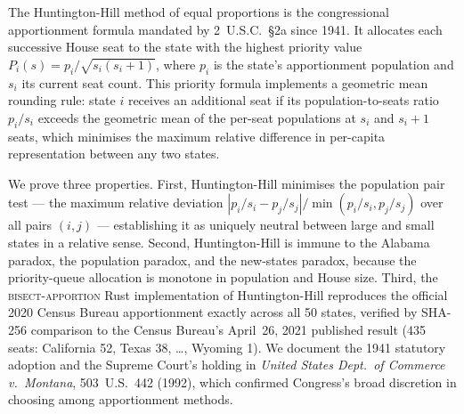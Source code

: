 The Huntington-Hill method of equal proportions is the congressional
apportionment formula mandated by 2~U.S.C.\ \S2a since 1941.
It allocates each successive House seat to the state with the highest
priority value $P_i(s) = p_i / \sqrt{s_i(s_i+1)}$, where $p_i$ is the
state's apportionment population and $s_i$ its current seat count.
This priority formula implements a geometric mean rounding rule:
state $i$ receives an additional seat if its population-to-seats ratio
$p_i/s_i$ exceeds the geometric mean of the per-seat populations at $s_i$
and $s_i+1$ seats, which minimises the maximum relative difference in
per-capita representation between any two states.

We prove three properties.
First, Huntington-Hill minimises the population pair test --- the maximum
relative deviation $|p_i/s_i - p_j/s_j| / \min(p_i/s_i, p_j/s_j)$
over all pairs $(i,j)$ --- establishing it as uniquely neutral between
large and small states in a relative sense.
Second, Huntington-Hill is immune to the Alabama paradox, the population
paradox, and the new-states paradox, because the priority-queue allocation
is monotone in population and House size.
Third, the \textsc{bisect-apportion} Rust implementation of
Huntington-Hill reproduces the official 2020 Census Bureau apportionment
exactly across all 50 states, verified by SHA-256 comparison to the
Census Bureau's April~26, 2021 published result (435 seats:
California 52, Texas 38, \ldots, Wyoming 1).
We document the 1941 statutory adoption and the Supreme Court's
holding in \textit{United States Dept.\ of Commerce v.\ Montana},
503~U.S.\ 442 (1992), which confirmed Congress's broad discretion
in choosing among apportionment methods.
